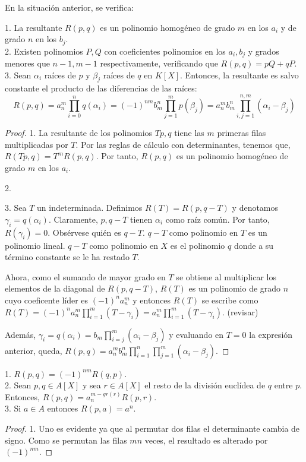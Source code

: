 \begin{theorem}
En la situación anterior, se verifica:

1. La resultante $R(p,q)$ es un polinomio homogéneo de grado $m$ en los $a_i$ y de grado $n$ en los $b_j$.\\
2. Existen polinomios $P,Q$ con coeficientes polinomios en los $a_i,b_j$ y grados menores que $n-1,m-1$ respectivamente, verificando que $R(p,q) = pQ+qP$. \\
3. Sean $\alpha_i$ raíces de $p$ y $\beta_j$ raíces de $q$ en $K[X]$. Entonces, la resultante es salvo constante el producto de las diferencias de las raíces: $$R(p,q) = a_n^m\prod_{i = 0}^n q(\alpha_i) = (-1)^{nm} b_m^n\prod_{j = 1}^m p(\beta_j) = a_n^mb_m^n\prod_{i,j = 1}^{n,m}(\alpha_i - \beta_j)$$
\end{theorem}
\begin{proof}
1. La resultante de los polinomios $Tp,q$ tiene las $m$ primeras filas multiplicadas por $T$. Por las reglas de cálculo con determinantes, tenemos que, $R(Tp,q) = T^{m}R(p,q)$. Por tanto, $R(p,q)$ es un polinomio homogéneo de grado $m$ en los $a_i$. 

2. 

3. Sea $T$ un indeterminada. Definimos $R(T) = R(p,q-T)$ y denotamos $\gamma_i = q(\alpha_i)$. Claramente, $p,q-T$ tienen $\alpha_i$ como raíz común. Por tanto, $R(\gamma_i) = 0$. Obsérvese quién es $q-T$. $q-T$ como polinomio en $T$ es un polinomio lineal. $q-T$ como polinomio en $X$ es el polinomio $q$ donde a su término constante se le ha restado $T$. 

Ahora, como el sumando de mayor grado en $T$ se obtiene al multiplicar los elementos de la diagonal de $R(p,q-T)$, $R(T)$ es un polinomio de grado $n$ cuyo coeficente líder es $(-1)^na_n^m$ y entonces $R(T)$ se escribe como $R(T) = (-1)^na_n^m \prod_{i = 1}^m (T-\gamma_i) = a_n^m \prod_{i = 1}^m (T-\gamma_i)$. (revisar)

Además, $\gamma_i = q(\alpha_i) = b_m \prod_{i = j}^m (\alpha_i - \beta_j)$ y evaluando en $T = 0$ la expresión anterior, queda, $R(p,q) = a_n^mb_m^n \prod_{i = 1}^n\prod_{j = 1}^m (\alpha_i - \beta_j)$.  

\end{proof}

\begin{proposition}
1. $R(p,q) = (-1)^{nm}R(q,p)$. \\
2. Sean $p,q \in A[X]$ y sea $r \in A[X]$ el resto de la división euclídea de $q$ entre $p$. Entonces, $R(p,q) = a_n^{m-gr(r)}R(p,r)$. \\
3. Si $a \in A$ entonces $R(p,a) = a^n$. 
\end{proposition}
\begin{proof}
1. Uno es evidente ya que al permutar dos filas el determinante cambia de signo. Como se permutan las filas $mn$ veces, el resultado es alterado por $(-1)^{nm}$.
\end{proof}